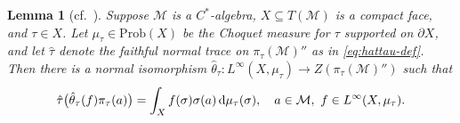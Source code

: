 \documentclass[a4paper,11pt]{amsart}
\newtheorem{lemma}[theorem]{Lemma}
\theoremstyle{definition}
\numberwithin{equation}{section}
\numberwithin{theorem}{section}
\newcommand{\M}{\mathcal{M}}
\begin{document}
\begin{lemma}[{cf.\ \cite[Lemma~10]{Oz13}}]\label{lem:oz-local}
    Suppose $\mathcal M$ is a $C^*$-algebra, $X \subseteq T(\mathcal M)$ is a compact face, and $\tau \in X$. Let $\mu_\tau \in \mathrm{Prob}(X)$ be the Choquet measure for $\tau$ supported on $\partial X$, and let $\hat \tau$ denote the faithful normal trace on $\pi_\tau(\mathcal M)''$ as in \eqref{eq:hattau-def}.  Then there is a normal isomorphism
    $\hat\theta_\tau\colon L^\infty(X, \mu_\tau) \rightarrow Z(\pi_\tau(\M)'')$ such that
    \begin{equation}\label{oz-1}
        \hat\tau\big(\hat\theta_\tau(f)\pi_\tau(a)\big) = \int_{X} f(\sigma)\sigma(a) \,{\rm d}\mu_\tau(\sigma), \quad a \in \mathcal M,\ f\in L^\infty(X,\mu_\tau).
    \end{equation}
\end{lemma}
\end{document}

